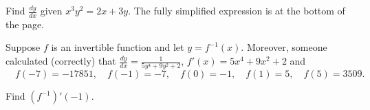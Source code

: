 \documentclass[../main.tex]{subfiles}
\begin{document}
\begin{exercise}
  Find \(\frac{dy}{dx}\) given \(x^{3}y^{2} = 2x + 3y\).
  \hfill
  {\footnotesize The fully simplified expression is at the bottom of the page.}

  \blanks*
\end{exercise}

\begin{exercise}
  Suppose \(f\) is an invertible function and let \(y = f^{-1}(x)\). Moreover, someone calculated (correctly) that \(\frac{dy}{dx} = \frac{1}{5y^{4} + 9y^{2} + 2}\), \(f'(x) = 5x^{4} + 9x^{2} + 2\) and
  \[
    \quad f(-7) = -17851,
    \quad f(-1) = -7,
    \quad f(0)  = -1,
    \quad f(1) = 5,
    \quad f(5) = 3509.
  \]

  Find \((f^{-1})'(-1)\).

\end{exercise}

\clearpage
\end{document}
